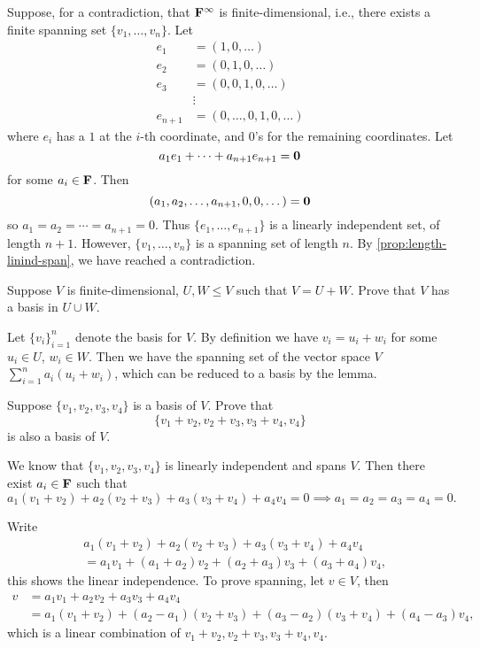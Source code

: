 \begin{solution}
Suppose, for a contradiction, that $\mathbf F^\infty$ is finite-dimensional, i.e., there exists a finite spanning set $\{v_1,\dots,v_n\}$.
Let
\begin{align*}
e_1&=(1,0,\dots)\\
e_2&=(0,1,0,\dots)\\
e_3&=(0,0,1,0,\dots)\\
&\vdots\\
e_{n+1}&=(0,\dots,0,1,0,\dots)
\end{align*}
where $e_i$ has a $1$ at the $i$-th coordinate, and $0$'s for the remaining coordinates. Let
\[a_1e_1+\cdots+a_{n+1}e_{n+1}=\vb{0}\]
for some $a_i\in\mathbf F$. Then
\[(a_1,a_2,\dots,a_{n+1},0,0,\dots)=\vb{0}\]
so $a_1=a_2=\cdots=a_{n+1}=0$. Thus $\{e_1,\dots,e_{n+1}\}$ is a linearly independent set, of length $n+1$. However, $\{v_1,\dots,v_n\}$ is a spanning set of length $n$. By \ref{prop:length-linind-span}, we have reached a contradiction.
\end{solution}

\begin{exercise}
Suppose $V$ is finite-dimensional, $U,W\le V$ such that $V=U+W$. Prove that $V$ has a basis in $U\cup W$.
\end{exercise}

\begin{solution}
Let $\{v_i\}_{i=1}^n$ denote the basis for $V$. By definition we have $v_i=u_i+w_i$ for some $u_i\in U$, $w_i\in W$. Then we have the spanning set of the vector space $V$ $\sum_{i=1}^{n}a_i(u_i+w_i)$, which can be reduced to a basis by the lemma.
\end{solution}

\begin{exercise}
Suppose $\{v_1,v_2,v_3,v_4\}$ is a basis of $V$. Prove that
\[\{v_1+v_2,v_2+v_3,v_3+v_4,v_4\}\]
is also a basis of $V$.
\end{exercise}

\begin{solution}
We know that $\{v_1,v_2,v_3,v_4\}$ is linearly independent and spans $V$. Then there exist $a_i\in\mathbf F$ such that
\[a_1(v_1+v_2)+a_2(v_2+v_3)+a_3(v_3+v_4)+a_4v_4=0\implies a_1=a_2=a_3=a_4=0.\]

Write
\begin{align*}
&a_1(v_1+v_2)+a_2(v_2+v_3)+a_3(v_3+v_4)+a_4v_4\\
&=a_1v_1+(a_1+a_2)v_2+(a_2+a_3)v_3+(a_3+a_4)v_4,
\end{align*}
this shows the linear independence. To prove spanning, let $v\in V$, then
\begin{align*}
v&=a_1v_1+a_2v_2+a_3v_3+a_4v_4\\
&=a_1(v_1+v_2)+(a_2-a_1)(v_2+v_3)+(a_3-a_2)(v_3+v_4)+(a_4-a_3)v_4,
\end{align*}
which is a linear combination of $v_1+v_2,v_2+v_3,v_3+v_4,v_4$.
\end{solution}

